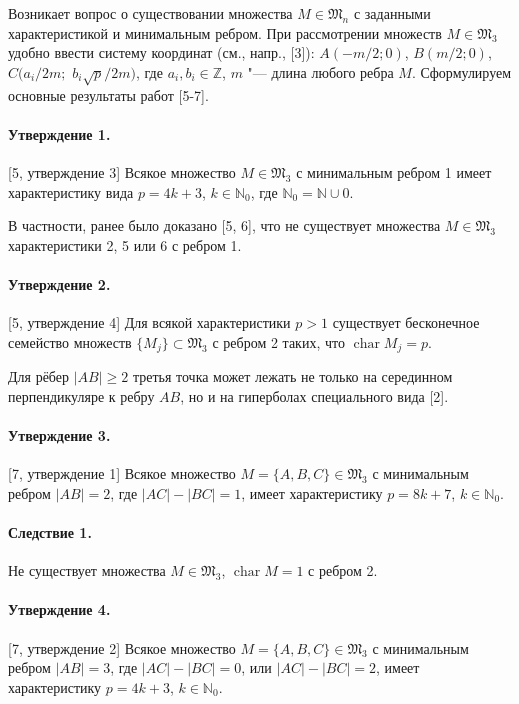 Возникает вопрос о существовании множества $M\in\mathfrak{M}_n$
с заданными характеристикой и минимальным ребром. При рассмотрении множеств $M \in \mathfrak{M}_{3}$ удобно ввести систему координат (см., напр., [3]):
 $A(-m/2;0)$, $B(m/2;0)$,
$C(a_i/2m;$ $b_i \sqrt{p}/2m)$, где $a_i, b_i \in \mathbb{Z}$, $m$ "--- длина любого ребра $M$.
Сформулируем основные результаты работ [5-7].



\paragraph{Утверждение 1.} [5, утверждение 3]
Всякое множество $M \in \mathfrak{M}_{3}$ с минимальным ребром 1 имеет характеристику вида
$p=4k+3$, $k\in\mathbb{N}_{0}$, где $ \mathbb{N}_{0}=\mathbb{N} \cup 0$.

В частности, ранее было доказано [5, 6], что не существует множества  $M \in \mathfrak{M}_{3}$ характеристики 2, 5 или 6 с ребром 1.



\paragraph{Утверждение 2.} [5, утверждение 4]
Для всякой характеристики $p>1$ существует бесконечное семейство множеств $\{M_j\}\subset\mathfrak{M}_3$ с ребром 2
таких, что $\operatorname{char}M_j = p$.

Для рёбер $|AB| \geq 2$ третья точка может лежать не только на серединном перпендикуляре к ребру $AB$, но и на гиперболах специального вида [2].

\paragraph{Утверждение 3.} [7, утверждение 1]
Всякое множество $M=\{A, B, C\} \in \mathfrak{M}_{3}$ с минимальным ребром $|AB|=2$, где $|AC|-|BC|=1$, имеет характеристику $p=8k+7$, $k\in\mathbb{N}_{0}$.

\paragraph{Следствие 1.}
Не существует множества $M \in \mathfrak{M}_{3}$,  $\operatorname{char} M = 1$ с ребром 2.

\paragraph{Утверждение 4.} [7, утверждение 2]
Всякое множество $M=\{A, B, C\} \in \mathfrak{M}_{3}$ с минимальным ребром $|AB|=3$, где $|AC|-|BC|=0$, или $|AC|-|BC|=2$, имеет характеристику $p=4k+3$, $k\in\mathbb{N}_{0}$.


